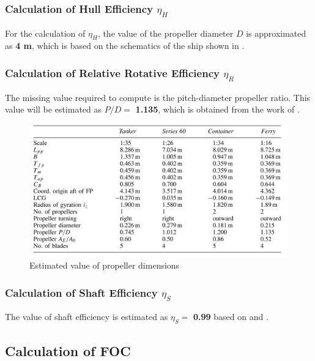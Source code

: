 \subsubsection*{Calculation of Hull Efficiency $\eta_H$}

For the calculation of $\eta_H$, the value of the propeller diameter $D$ is approximated as \textbf{4 m}, which is based on the schematics of the ship shown in .

\subsubsection*{Calculation of Relative Rotative Efficiency $\eta_R$}

The missing value required to compute  is the pitch-diameter propeller ratio. This value will be estimated as $P/D =$ \textbf{1.135}, which is obtained from the work of .

\begin{figure}[h]
    \centering
        \includegraphics[width=.95\textwidth]{02_figures/betram_wolff_ratiomodel .jpg}
        \caption{Estimated value of propeller dimensions }
        \label{fig:betram_wolff_propellerdimensions}
\end{figure}

\subsubsection*{Calculation of Shaft Efficiency $\eta_S$}

The value of shaft efficiency is estimated as $\eta_S =$ \textbf{0.99} based on  and .

\subsection{Calculation of FOC}\label{sec:FOC_calc_method}

